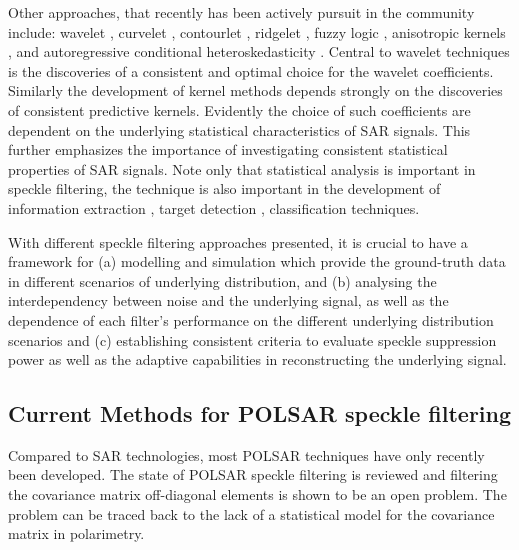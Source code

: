 Other approaches, that recently has been actively pursuit in the community include: 
	wavelet \cite{Gagnon_SPIEProc_1997, VidalPantaleoni_2004_IJRS, Moulin_1993_JMathImageVision, Hervet_1998_SPIE, Hebar_2009_TGRS, Chen_2007_IET, Bianchi_TGRS_2008, Argenti_2006_TGRS}, 
	curvelet \cite{Wang_2007_ICWAPR, Saevarsson_2003_IGARSS, Guo_2008_ICARCV}, 
	contourlet \cite{Foucher_2006_IGARSS}, 
	ridgelet \cite{Saevarsson_2004_IGARSS},
	fuzzy logic \cite{Cheng_ETCS_2009}, 
	anisotropic kernels \cite{DHondt_2006_TGRS}, 
	and autoregressive conditional heteroskedasticity \cite{Amirmazlaghani_2009_DSPWorkshop}. %
Central to wavelet techniques is the discoveries of a consistent and optimal choice for the wavelet coefficients.
Similarly the development of kernel methods depends strongly on the discoveries of consistent predictive kernels.
Evidently the choice of such coefficients are dependent on the underlying statistical characteristics of SAR signals.
This further emphasizes the importance of investigating consistent statistical properties of SAR signals.
Note only that statistical analysis is important in speckle filtering, the technique is also important in the development of information extraction \cite{Oliver_1991_JPhysDApplPhys}, target detection \cite{Luttrell_1986_JPhysDApplPhys}, classification \cite{Nyoungui_2002_IntlJRemoteSense} techniques. 

With different speckle filtering approaches presented, it is crucial to have a framework for 
	(a) modelling and simulation which provide the ground-truth data in different scenarios of underlying distribution, and
	(b) analysing the interdependency between noise and the underlying signal, as well as the dependence of each filter's performance on the different underlying distribution scenarios and
	(c) establishing consistent criteria to evaluate speckle suppression power as well as the adaptive capabilities in reconstructing the underlying signal.

\subsection{Current Methods for POLSAR speckle filtering }

Compared to SAR technologies, most POLSAR techniques have only recently been developed. 
The state of POLSAR speckle filtering is reviewed and filtering the covariance matrix off-diagonal elements is shown to be an open problem.
The problem can be traced back to the lack of a statistical model for the covariance matrix in polarimetry.

